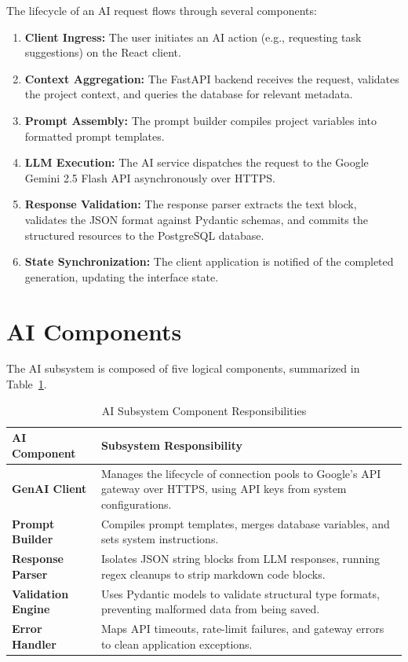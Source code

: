 The lifecycle of an AI request flows through several components:
\begin{enumerate}
    \item \textbf{Client Ingress:} The user initiates an AI action (e.g., requesting task suggestions) on the React client.
    \item \textbf{Context Aggregation:} The FastAPI backend receives the request, validates the project context, and queries the database for relevant metadata.
    \item \textbf{Prompt Assembly:} The prompt builder compiles project variables into formatted prompt templates.
    \item \textbf{LLM Execution:} The AI service dispatches the request to the Google Gemini 2.5 Flash API asynchronously over HTTPS.
    \item \textbf{Response Validation:} The response parser extracts the text block, validates the JSON format against Pydantic schemas, and commits the structured resources to the PostgreSQL database.
    \item \textbf{State Synchronization:} The client application is notified of the completed generation, updating the interface state.
\end{enumerate}

\section{AI Components}
The AI subsystem is composed of five logical components, summarized in Table~\ref{tab:ai_components}.

\begin{table}[h!]
\centering
\small
\renewcommand{\arraystretch}{1.4}
\begin{tabularx}{\textwidth}{l X}
    \toprule[1.5pt]
    \rowcolor{primary!5}
    \textbf{\color{primary}AI Component} & \textbf{\color{primary}Subsystem Responsibility} \\
    \midrule
    \textbf{GenAI Client} & Manages the lifecycle of connection pools to Google's API gateway over HTTPS, using API keys from system configurations. \\
    \textbf{Prompt Builder} & Compiles prompt templates, merges database variables, and sets system instructions. \\
    \textbf{Response Parser} & Isolates JSON string blocks from LLM responses, running regex cleanups to strip markdown code blocks. \\
    \textbf{Validation Engine} & Uses Pydantic models to validate structural type formats, preventing malformed data from being saved. \\
    \textbf{Error Handler} & Maps API timeouts, rate-limit failures, and gateway errors to clean application exceptions. \\
    \bottomrule[1.5pt]
\end{tabularx}
\caption{AI Subsystem Component Responsibilities}
\label{tab:ai_components}
\end{table}

